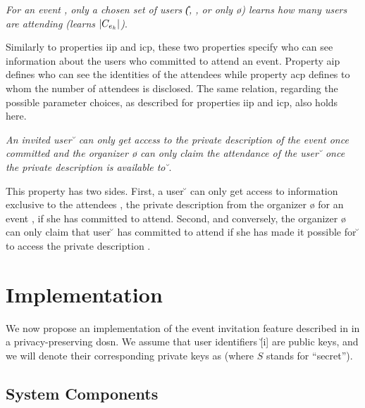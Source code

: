 {	%
	\begin{propertydef}[\Ac{acp}]
		\textit{For an event \e{}, only a chosen 
		set of users (\eg \U{}, \I{}, \C{} or only \o{}) learns
		how many users are attending (\ie learns $| \C{} |$)}.
	\end{propertydef}
	Similarly to properties \Ac{iip} and \Ac{icp}, these two properties specify who 
	can see information about the users who committed to attend an event.  
	Property \Ac{aip} defines who can see the identities of the attendees while 
	property \Ac{acp} defines to whom the number of attendees is disclosed. The 
	same relation, regarding the possible parameter choices, as
	described for properties \Ac{iip} and \Ac{icp}, also holds here.

	\begin{propertydef}[\Ac{air}]
		\textit{An invited user \u{} can only get access to the private description 
		\dS{} of the event \e{} once committed and the organizer \o{} 
		can only claim the attendance of the user \u{} once the private description 
		\dS{} is available to \u{}}.
		\par \noindent
		This property has two sides. First, a user \u{} can only get access
		to information exclusive to the attendees \C{}, \ie the private description
		\dS{} from the organizer \o{} for an event \e{},
		if she has committed to attend. Second, and conversely, the
		organizer \o{} can only claim that user \u{} has
		committed to attend if she has made it possible for \u{} to access
		the private description \dS{}.
	\end{propertydef}

}

\section{Implementation}
	\label{section:event-invitations-dosns:implementation}
We now propose an implementation of the event invitation feature described in  in 
a privacy-preserving \Ac{dosn}. We assume that user identifiers \u[i] are 
public keys, and we will denote their corresponding private keys as \uS[i] (where 
$S$ stands for ``secret'').

\subsection{System Components}
	\label{subsection:event-invitations-dosns:system-components}

